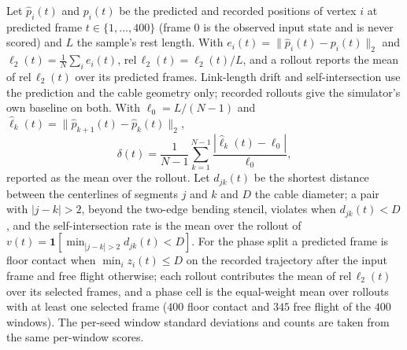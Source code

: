 \documentclass[mlabstract,onecolumn]{jmlr}
\newcommand{\rel}{\mathrm{rel}\,\ell_2}
\begin{document}
Let $\hat p_i(t)$ and $p_i(t)$ be the predicted and recorded positions of
vertex $i$ at predicted frame $t\in\{1,\dots,400\}$ (frame $0$ is the observed
input state and is never scored) and $L$ the sample's rest length. With
$e_i(t)=\|\hat p_i(t)-p_i(t)\|_2$ and $\ell_2(t)=\frac1N\sum_i e_i(t)$,
$\rel(t)=\ell_2(t)/L$, and a rollout reports the mean of $\rel(t)$ over its
predicted frames. Link-length drift and self-intersection use the prediction
and the cable geometry only; recorded rollouts give the simulator's own
baseline on both. With $\ell_0=L/(N-1)$ and
$\hat\ell_k(t)=\|\hat p_{k+1}(t)-\hat p_k(t)\|_2$,
\begin{equation}
\delta(t)=\frac{1}{N-1}\sum_{k=1}^{N-1}\frac{|\hat\ell_k(t)-\ell_0|}{\ell_0},
\end{equation}
reported as the mean over the rollout. Let $d_{jk}(t)$ be the shortest
distance between the centerlines of segments $j$ and $k$ and $D$ the cable
diameter; a pair with $|j-k|>2$, beyond the two-edge bending stencil, violates
when $d_{jk}(t)<D$, and the self-intersection rate is the mean over the rollout
of $v(t)=\mathbf{1}[\min_{|j-k|>2}d_{jk}(t)<D]$. For the phase split a
predicted frame is floor contact when $\min_i z_i(t)\le D$ on the recorded
trajectory after the input frame and free flight otherwise; each rollout
contributes the mean of $\rel(t)$ over its selected frames, and a phase cell is
the equal-weight mean over rollouts with at least one selected frame ($400$
floor contact and $345$ free flight of the $400$ windows). The per-seed window
standard deviations and counts are taken from the same per-window scores.
\end{document}
